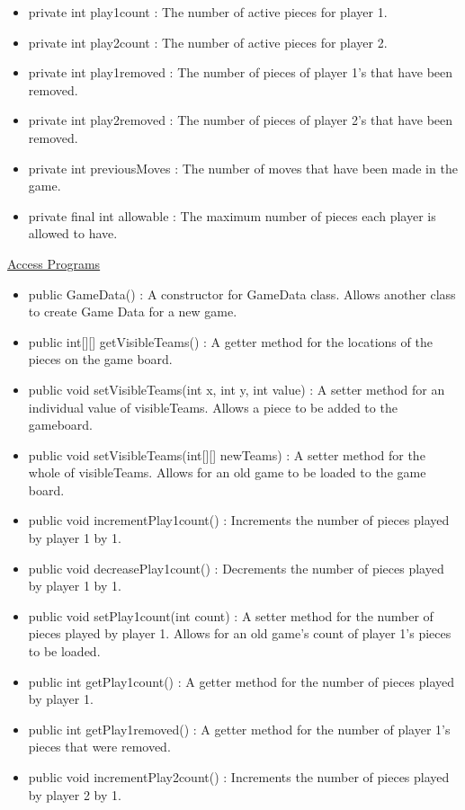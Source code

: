 \documentclass[12pt]{article}
\begin{document}
\begin{itemize}
\begin{itemize}
			\item private int play1count : The number of active pieces for player 1.
			\item private int play2count : The number of active pieces for player 2.
			\item private int play1removed : The number of pieces of player 1’s that have been removed.
			\item private int play2removed : The number of pieces of player 2’s that have been removed.
			\item private int previousMoves : The number of moves that have been made in the game.
			\item private final int allowable : The maximum number of pieces each player is allowed to have.
			
		\end{itemize}
		\underline{Access Programs}
		\begin{itemize}
			\item public GameData() : A constructor for GameData class. Allows another class to create Game Data for a new game.
			\item public int[][] getVisibleTeams() : A getter method for the locations of the pieces on the game board.
			\item public void setVisibleTeams(int x, int y, int value) : A setter method for an individual value of visibleTeams. Allows a piece to be added to the gameboard.
			\item public void setVisibleTeams(int[][] newTeams) : A setter method for the whole of visibleTeams. Allows for an old game to be loaded to the game board.
			\item public void incrementPlay1count() : Increments the number of pieces played by player 1 by 1.
			\item public void decreasePlay1count() : Decrements the number of pieces played by player 1 by 1.
			\item public void setPlay1count(int count) : A setter method for the number of pieces played by player 1. Allows for an old game’s count of player 1’s pieces to be loaded.
			\item public int getPlay1count() : A getter method for the number of pieces played by player 1.
			\item public int getPlay1removed() : A getter method for the number of player 1’s pieces that were removed.
			\item public void incrementPlay2count() : Increments the number of pieces played by player 2 by 1.

\end{itemize}
\end{itemize}
\end{document}

